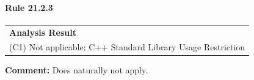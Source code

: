 \paragraph{Rule 21.2.3}
\begin{longtable}{p{13cm}}
\textbf{Analysis Result} \\
(C1) Not applicable: C++ Standard Library Usage Restriction \\
\end{longtable}
\textbf{Comment:} Does naturally not apply. \\

